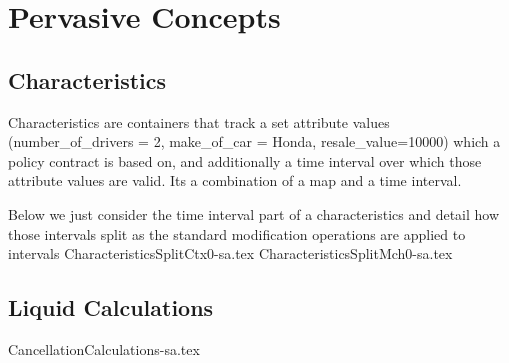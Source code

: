 \motto{}
\chapter{Pervasive Concepts}
\label{intro03} %

\abstract{
}

\section{Characteristics}
\label{sec:03:1}

Characteristics are containers that track a set attribute values
(number\_of\_drivers = 2, make\_of\_car = Honda, resale\_value=10000)
which a policy contract is based on, and additionally a time interval over which
those attribute values are valid. Its a combination of a map and a time
interval. 

Below we just consider the time interval part of a characteristics and detail
how those intervals split as the standard modification operations are applied
to intervals
{CharacteristicsSplitCtx0-sa.tex}
{CharacteristicsSplitMch0-sa.tex}

\section{Liquid Calculations}
\label{sec:03:2}

{CancellationCalculations-sa.tex}


